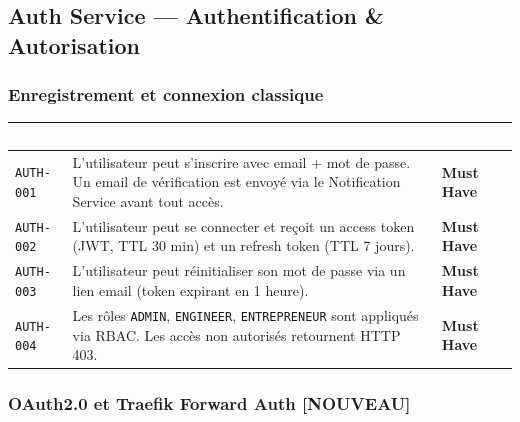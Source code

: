 \documentclass[12pt,a4paper]{article}
\newcommand{\req}[1]{\texttt{\textcolor{daedalusblue}{#1}}}
\newcommand{\NEW}{\textcolor{daedalusgold}{\textbf{[NOUVEAU]}}}
\newcommand{\musthave}{\cellcolor{musthave}\textbf{Must Have}}
\begin{document}
\subsection{Auth Service — Authentification \& Autorisation}

\subsubsection{Enregistrement et connexion classique}

\begin{tabularx}{\textwidth}{|l|X|l|}
\hline
\rowcolor{tablehead}\textcolor{white}{\textbf{ID}} & \textcolor{white}{\textbf{Exigence}} & \textcolor{white}{\textbf{Priorité}} \\
\hline
\req{AUTH-001} & L'utilisateur peut s'inscrire avec email + mot de passe. Un email de vérification est envoyé via le Notification Service avant tout accès. & \musthave \\
\hline
\req{AUTH-002} & L'utilisateur peut se connecter et reçoit un access token (JWT, TTL 30 min) et un refresh token (TTL 7 jours). & \musthave \\
\hline
\req{AUTH-003} & L'utilisateur peut réinitialiser son mot de passe via un lien email (token expirant en 1 heure). & \musthave \\
\hline
\req{AUTH-004} & Les rôles \texttt{ADMIN}, \texttt{ENGINEER}, \texttt{ENTREPRENEUR} sont appliqués via RBAC. Les accès non autorisés retournent HTTP 403. & \musthave \\
\hline
\end{tabularx}

\subsubsection{OAuth2.0 et Traefik Forward Auth \NEW}
\end{document}
